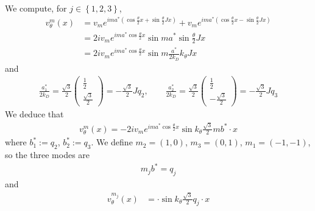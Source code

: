 \documentclass[11pt,a4paper,reqno,french,tikz]{amsart}
\newcommand{\pa}[1]{\left( #1 \right)} %
\newcommand{\acs}[1]{\left\{ #1 \right\}} %
\newcommand{\f}[2]{\frac{#1}{#2}} %
\newcommand{\mat}[1]{\begin{pmatrix} #1 \end{pmatrix}} %
\begin{document}
We compute, for $j \in \acs{1,2,3}$,
\begin{align*}
	v^m_\theta(x) &= v_m e^{ima^* \pa{\cos \f{\theta}{2} x + \sin \f{\theta}{2} J x}} +   v_m e^{ima^* \pa{\cos \f{\theta}{2} x - \sin \f{\theta}{2} J x}} \\
		    &= 2i v_m e^{ima^* \cos \f{\theta}{2} x}  \sin ma^* \sin \f{\theta}{2}  Jx \\
		    &=  2i v_m e^{ima^* \cos \f{\theta}{2} x}  \sin m\f{a^*}{2 k_D} k_\theta J x
\end{align*}
and
\begin{align*}
\f{a^*_1}{2 k_D} = \f{\sqrt 3}{2} \mat{ \f{1}{2} \\ \f{\sqrt 3}{2}} = - \f{\sqrt 3}{2} Jq_2, \qquad \f{a^*_2}{2 k_D} = \f{\sqrt 3}{2} \mat{ \f{1}{2} \\ -\f{\sqrt 3}{2}}= - \f{\sqrt 3}{2} Jq_3
\end{align*}
We deduce that
\begin{align*}
	v^m_\theta(x) =  -2i v_m e^{ima^* \cos \f{\theta}{2} x}  \sin k_\theta \f{\sqrt 3}{2} mb^* \cdot x
\end{align*}
where $b^*_1 := q_2$, $b^*_2 := q_3$. We define $m_2=(1,0)$, $m_3=(0,1)$, $m_1 = (-1,-1)$, so the three modes are
\begin{align*}
m_j b^* = q_j
\end{align*}
and
\begin{align*}
	v^{m_j}_\theta(x) &=  \cdot \sin k_\theta \f{\sqrt 3}{2} q_j \cdot x 
\end{align*}












\end{document}
